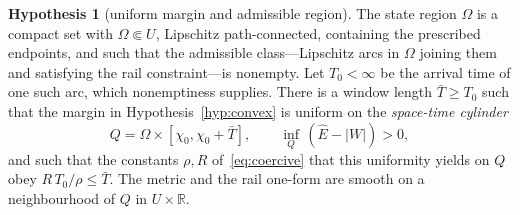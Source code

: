 \documentclass[12pt]{iopart}
\newcommand{\Ehat}{\hat E}
\theoremstyle{plain}
\theoremstyle{definition}
\newtheorem{hypothesis}{Hypothesis}
\theoremstyle{plain}
\theoremstyle{remark}
\begin{document}
\begin{hypothesis}[uniform margin and admissible region]\label{hyp:coercive}
The state region $\Omega$ is a compact set with $\Omega\Subset U$, Lipschitz
path-connected, containing the prescribed endpoints, and such that the admissible
class---Lipschitz arcs in $\Omega$ joining them and satisfying the rail
constraint---is nonempty. Let $T_0<\infty$ be the arrival time of one such arc,
which nonemptiness supplies. There is a window length $\bar T\ge T_0$ such that the
margin in Hypothesis~\ref{hyp:convex} is uniform on the \emph{space-time cylinder}
\begin{equation}
    Q=\Omega\times[\chi_0,\chi_0+\bar T],\qquad
    \inf_{Q}\,(\Ehat-|W|)>0 ,
    \label{eq:cylinder}
\end{equation}
and such that the constants $\rho,R$ of~\eqref{eq:coercive} that this uniformity
yields on $Q$ obey $R\,T_0/\rho\le\bar T$. The metric and the rail one-form are
smooth on a neighbourhood of $Q$ in $U\times\mathbb R$.
\end{hypothesis}
\end{document}
